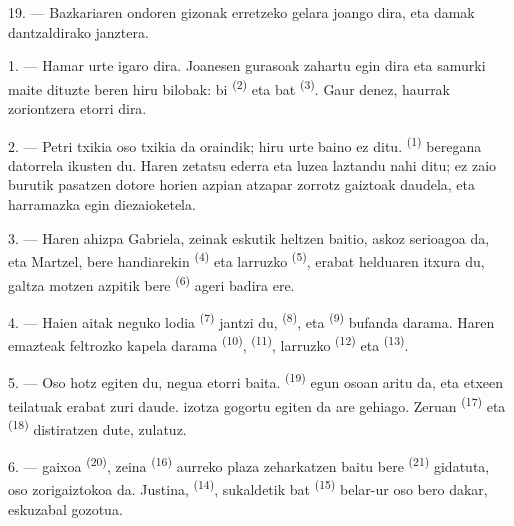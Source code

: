 19. --- Bazkariaren ondoren gizonak erretzeko gelara joango dira, eta damak
dantzaldirako janztera.

\VUsaut{5.0mm}
\VUsaut{1.6mm}
\VUsaut{2.6mm}

\VUsaut{3.0mm}

1. --- Hamar urte igaro dira. Joanesen gurasoak zahartu egin dira eta samurki
maite dituzte beren hiru bilobak: bi  \textsuperscript{(2)} eta
 bat \textsuperscript{(3)}. Gaur  denez, haurrak zoriontzera etorri dira.

2. --- Petri txikia oso txikia da oraindik; hiru urte baino ez ditu.
 \textsuperscript{(1)} beregana datorrela ikusten du. Haren
 zetatsu ederra eta  luzea laztandu nahi ditu; ez zaio
burutik pasatzen  dotore horien azpian atzapar zorrotz gaiztoak
daudela, eta harramazka egin diezaioketela.

3. --- Haren ahizpa Gabriela, zeinak eskutik heltzen baitio, askoz serioagoa da,
eta Martzel, bere  handiarekin \textsuperscript{(4)} eta larruzko
 \textsuperscript{(5)}, erabat helduaren itxura du, galtza
motzen azpitik bere  \textsuperscript{(6)} ageri badira
ere.

4. --- Haien aitak neguko  lodia \textsuperscript{(7)} jantzi du,
 \textsuperscript{(8)}, eta 
\textsuperscript{(9)} bufanda darama. Haren emazteak feltrozko kapela darama
 \textsuperscript{(10)},  \textsuperscript{(11)},
larruzko  \textsuperscript{(12)} eta 
\textsuperscript{(13)}.

5. --- Oso hotz egiten du, negua etorri baita. 
\textsuperscript{(19)} egun osoan aritu da, eta etxeen teilatuak erabat zuri
daude.  izotza gogortu egiten da are gehiago. Zeruan
 \textsuperscript{(17)} eta 
\textsuperscript{(18)} distiratzen dute,  zulatuz.

\VUsaut{4.2mm}
\VUsaut{3.0mm}

6. ---  gaixoa \textsuperscript{(20)}, zeina 
\textsuperscript{(16)} aurreko plaza zeharkatzen baitu bere 
\textsuperscript{(21)} gidatuta, oso zorigaiztokoa da. Justina,
 \textsuperscript{(14)}, sukaldetik  bat
\textsuperscript{(15)} belar-ur oso bero dakar, eskuzabal gozotua.

